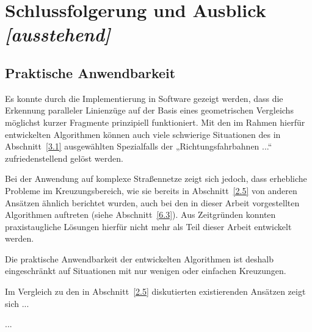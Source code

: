 \documentclass[../main/thesis.tex]{subfiles}
\begin{document}
\chapter{Schlussfolgerung und Ausblick \emph{[ausstehend]}}

\section{Praktische Anwendbarkeit}

Es konnte durch die Implementierung in Software gezeigt werden, dass die Erkennung paralleler Linienzüge auf der Basis eines geometrischen Vergleichs möglichst kurzer Fragmente prinzipiell funktioniert.
Mit den im Rahmen hierfür entwickelten Algorithmen können auch viele schwierige Situationen des in Abschnitt~\ref{3.1} ausgewählten Spezialfalls der „Richtungsfahrbahnen ...“ zufriedenstellend gelöst werden.

Bei der Anwendung auf komplexe Straßennetze zeigt sich jedoch, dass erhebliche Probleme im Kreuzungsbereich, wie sie bereits in Abschnitt~\ref{2.5} von anderen Ansätzen ähnlich berichtet wurden, auch bei den in dieser Arbeit vorgestellten Algorithmen auftreten (siehe Abschnitt~\ref{6.3}).
Aus Zeitgründen konnten praxistaugliche Lösungen hierfür nicht mehr als Teil dieser Arbeit entwickelt werden.

Die praktische Anwendbarkeit der entwickelten Algorithmen ist deshalb eingeschränkt auf Situationen mit nur wenigen oder einfachen Kreuzungen.

Im Vergleich zu den in Abschnitt~\ref{2.5} diskutierten existierenden Ansätzen zeigt sich ...

...
\end{document}
